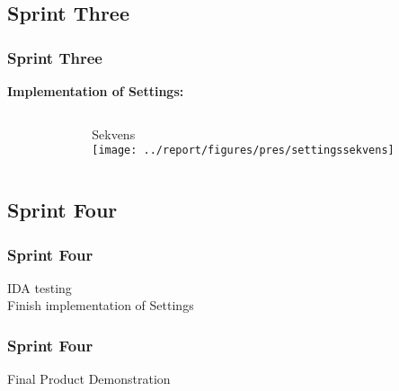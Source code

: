 \subsection{Sprint Three}
\begin{frame}
\frametitle{Sprint Three}
\begin{center}
\textbf{Implementation of Settings:}
\end{center}
\begin{columns}
\begin{column}{0.5\textwidth}

          \begin{center}
        \end{center}
        \begin{center}
        \end{center}
\end{column}
\begin{column}{0.5\textwidth}
        \begin{center}
         \end{center}
        \begin{center}
                     {Sekvens\\
                     \texttt{[image: ../report/figures/pres/settingssekvens]}}
        \end{center}
\end{column}
\end{columns}
\end{frame}

\subsection{Sprint Four}
\begin{frame}
\frametitle{Sprint Four}
\begin{center}
IDA testing\\
\pause
{Finish implementation of Settings}\\
\end{center}
\end{frame}

\begin{frame}
\frametitle{Sprint Four}
\begin{center}
Final Product Demonstration
\end{center}
\end{frame}
